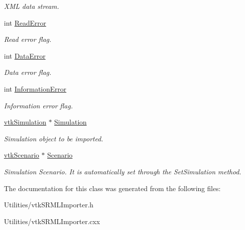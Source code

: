 \begin{DoxyCompactItemize}
\begin{DoxyCompactList}\small\item\em XML data stream. \item\end{DoxyCompactList}\item 
\hypertarget{classvtkSRMLImporter_ab32c7b873c730d367cbf115a4af0182b}{
int \hyperlink{classvtkSRMLImporter_ab32c7b873c730d367cbf115a4af0182b}{ReadError}}
\label{classvtkSRMLImporter_ab32c7b873c730d367cbf115a4af0182b}

\begin{DoxyCompactList}\small\item\em Read error flag. \item\end{DoxyCompactList}\item 
\hypertarget{classvtkSRMLImporter_ac2c32411de689f5dfed773e60b781b2b}{
int \hyperlink{classvtkSRMLImporter_ac2c32411de689f5dfed773e60b781b2b}{DataError}}
\label{classvtkSRMLImporter_ac2c32411de689f5dfed773e60b781b2b}

\begin{DoxyCompactList}\small\item\em Data error flag. \item\end{DoxyCompactList}\item 
\hypertarget{classvtkSRMLImporter_a37fc532df5f0f9799ca43ddb1032cacb}{
int \hyperlink{classvtkSRMLImporter_a37fc532df5f0f9799ca43ddb1032cacb}{InformationError}}
\label{classvtkSRMLImporter_a37fc532df5f0f9799ca43ddb1032cacb}

\begin{DoxyCompactList}\small\item\em Information error flag. \item\end{DoxyCompactList}\item 
\hypertarget{classvtkSRMLImporter_ab0512ee42e60dd8862b8615d5bbecae7}{
\hyperlink{classvtkSimulation}{vtkSimulation} $\ast$ \hyperlink{classvtkSRMLImporter_ab0512ee42e60dd8862b8615d5bbecae7}{Simulation}}
\label{classvtkSRMLImporter_ab0512ee42e60dd8862b8615d5bbecae7}

\begin{DoxyCompactList}\small\item\em Simulation object to be imported. \item\end{DoxyCompactList}\item 
\hypertarget{classvtkSRMLImporter_a8b939d3cfd5cfbfeaf8cc267afdc31e7}{
\hyperlink{classvtkScenario}{vtkScenario} $\ast$ \hyperlink{classvtkSRMLImporter_a8b939d3cfd5cfbfeaf8cc267afdc31e7}{Scenario}}
\label{classvtkSRMLImporter_a8b939d3cfd5cfbfeaf8cc267afdc31e7}

\begin{DoxyCompactList}\small\item\em Simulation Scenario. It is automatically set through the SetSimulation method. \item\end{DoxyCompactList}\end{DoxyCompactItemize}


The documentation for this class was generated from the following files:\begin{DoxyCompactItemize}
\item 
Utilities/vtkSRMLImporter.h\item 
Utilities/vtkSRMLImporter.cxx\end{DoxyCompactItemize}
